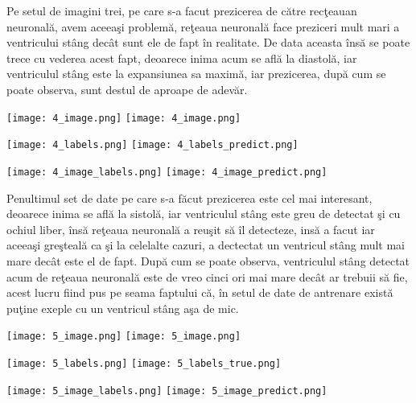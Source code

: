 Pe setul de imagini trei, pe care s-a facut prezicerea de c\u{a}tre rec\c{t}eauan neuronal\u{a}, avem aceea\c{s}i problem\u{a}, re\c{t}eaua neuronal\u{a} face preziceri mult mari a ventricului st\^{a}ng dec\^{a}t sunt ele de fapt \^{i}n realitate. De data aceasta \^{i}ns\u{a} se poate trece cu vederea acest fapt, deoarece inima acum se afl\u{a} la diastol\u{a}, iar ventriculul st\^{a}ng este la expansiunea sa maxim\u{a}, iar prezicerea, dup\u{a} cum se poate observa, sunt destul de aproape de adev\u{a}r.

\begin{center}
\texttt{[image: 4\_image.png]}
\texttt{[image: 4\_image.png]}
\end{center}

\begin{center}
\texttt{[image: 4\_labels.png]}
\texttt{[image: 4\_labels\_predict.png]}
\end{center}

\begin{center}
\texttt{[image: 4\_image\_labels.png]}
\texttt{[image: 4\_image\_predict.png]}
\end{center}

Penultimul set de date pe care s-a f\u{a}cut prezicerea este cel mai interesant, deoarece inima se afl\u{a} la sistol\u{a}, iar ventriculul st\^{a}ng este greu de detectat \c{s}i cu ochiul liber, \^{i}ns\u{a} re\c{t}eaua neuronal\u{a} a reu\c{s}it s\u{a} \^{i}l detecteze, ins\u{a} a facut iar aceea\c{s}i gre\c{s}teal\u{a} ca \c{s}i la celelalte cazuri, a dectectat un ventricul st\^{a}ng mult mai mare dec\^{a}t este el de fapt. Dup\u{a} cum se poate observa, ventriculul st\^{a}ng detectat acum de re\c{t}eaua neuronal\u{a} este de vreo cinci ori mai mare dec\^{a}t ar trebuii s\u{a} fie, acest lucru fiind pus pe seama faptului c\u{a}, \^{i}n setul de date de antrenare exist\u{a} pu\c{t}ine exeple cu un ventricul st\^{a}ng a\c{s}a de mic.

\begin{center}
\texttt{[image: 5\_image.png]}
\texttt{[image: 5\_image.png]}
\end{center}

\begin{center}
\texttt{[image: 5\_labels.png]}
\texttt{[image: 5\_labels\_true.png]}
\end{center}

\begin{center}
\texttt{[image: 5\_image\_labels.png]}
\texttt{[image: 5\_image\_predict.png]}
\end{center}


